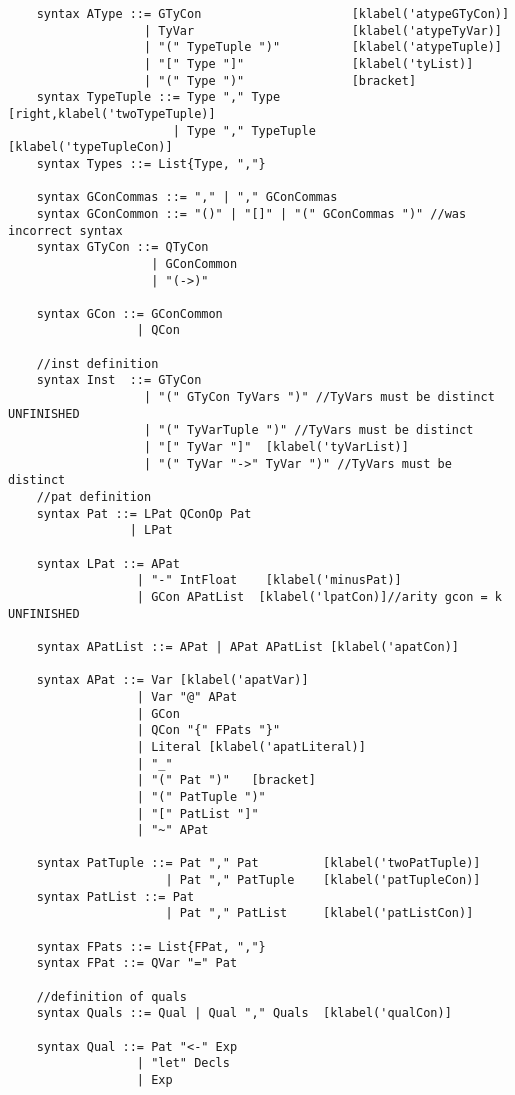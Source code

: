 \begin{lstlisting}
    syntax AType ::= GTyCon                     [klabel('atypeGTyCon)]
                   | TyVar                      [klabel('atypeTyVar)]
                   | "(" TypeTuple ")"          [klabel('atypeTuple)]
                   | "[" Type "]"               [klabel('tyList)]
                   | "(" Type ")"               [bracket]
    syntax TypeTuple ::= Type "," Type          [right,klabel('twoTypeTuple)]
                       | Type "," TypeTuple     [klabel('typeTupleCon)]
    syntax Types ::= List{Type, ","}

    syntax GConCommas ::= "," | "," GConCommas
    syntax GConCommon ::= "()" | "[]" | "(" GConCommas ")" //was incorrect syntax
    syntax GTyCon ::= QTyCon
                    | GConCommon
                    | "(->)"

    syntax GCon ::= GConCommon
                  | QCon

    //inst definition
    syntax Inst  ::= GTyCon
                   | "(" GTyCon TyVars ")" //TyVars must be distinct UNFINISHED
                   | "(" TyVarTuple ")" //TyVars must be distinct
                   | "[" TyVar "]"  [klabel('tyVarList)]
                   | "(" TyVar "->" TyVar ")" //TyVars must be distinct
    //pat definition
    syntax Pat ::= LPat QConOp Pat
                 | LPat

    syntax LPat ::= APat
                  | "-" IntFloat    [klabel('minusPat)]
                  | GCon APatList  [klabel('lpatCon)]//arity gcon = k UNFINISHED

    syntax APatList ::= APat | APat APatList [klabel('apatCon)]

    syntax APat ::= Var [klabel('apatVar)]
                  | Var "@" APat
                  | GCon
                  | QCon "{" FPats "}"
                  | Literal [klabel('apatLiteral)]
                  | "_"
                  | "(" Pat ")"   [bracket]
                  | "(" PatTuple ")"
                  | "[" PatList "]"
                  | "~" APat

    syntax PatTuple ::= Pat "," Pat         [klabel('twoPatTuple)]
                      | Pat "," PatTuple    [klabel('patTupleCon)]
    syntax PatList ::= Pat
                      | Pat "," PatList     [klabel('patListCon)]

    syntax FPats ::= List{FPat, ","}
    syntax FPat ::= QVar "=" Pat

    //definition of quals
    syntax Quals ::= Qual | Qual "," Quals  [klabel('qualCon)]

    syntax Qual ::= Pat "<-" Exp
                  | "let" Decls
                  | Exp


\end{lstlisting}
